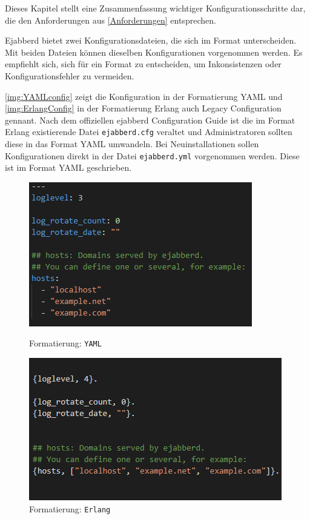 \documentclass[a4paper,titlepage,halfparskip,12pt]{scrreprt}
\begin{document}
\begin{onehalfspacing}
Dieses Kapitel stellt eine Zusammenfassung wichtiger Konfigurationsschritte dar, die den Anforderungen aus \autoref{Anforderungen} entsprechen.

Ejabberd bietet zwei Konfigurationsdateien, die sich im Format unterscheiden. Mit beiden Dateien können dieselben Konfigurationen vorgenommen werden. Es empfiehlt sich, sich für ein Format zu entscheiden, um Inkonsistenzen oder Konfigurationsfehler zu vermeiden.

\autoref{img:YAMLconfig} zeigt die Konfiguration in der Formatierung \ac{YAML} und \autoref{img:ErlangConfig} in der Formatierung Erlang auch Legacy Configuration gennant. Nach dem offiziellen ejabberd Configuration Guide \cite{ejabberdDoc} ist die im Format Erlang existierende Datei \texttt{ejabberd.cfg} veraltet und Administratoren sollten diese in das Format \ac{YAML} umwandeln. Bei Neuinstallationen sollen Konfigurationen direkt in der Datei \texttt{ejabberd.yml} vorgenommen werden. Diese ist im Format \ac{YAML} geschrieben.

\begin{figure}
\centering
\begin{minipage}{.5\textwidth}
  \centering
  \includegraphics[width=.8\linewidth]{images/exampleYAMLConfig}
  \caption{Formatierung: \texttt{YAML}}
  \label{img:YAMLconfig}
\end{minipage}%
\begin{minipage}{.5\textwidth}
  \centering
  \includegraphics[width=.9\linewidth]{images/ejabberdErlangConfig}
  \caption{Formatierung: \texttt{Erlang}}
  \label{img:ErlangConfig}
\end{minipage}
\end{figure}


\end{onehalfspacing}
\end{document}
